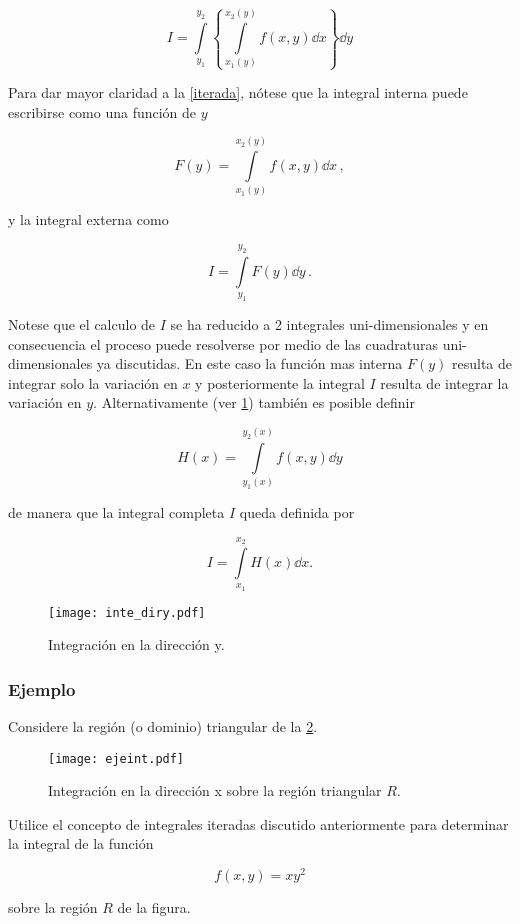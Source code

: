 \begin{equation}
  I = \int\limits_{y_1}^{y_2} \left\{ \int\limits_{x_1(y)}^{x_2(y)} f(x,y) \dd{x}  \right\} \dd{y}
  \label{iterada}
\end{equation}


Para dar mayor claridad a la \cref{iterada}, nótese que la integral interna puede escribirse como una función de $y$

\[F(y) = \int\limits_{x_1(y)}^{x_2(y)} f(x,y) \dd{x}\, , \]

y la integral externa como

\[I = \int\limits_{y_1}^{y_2} F(y) \dd{y}\, . \]

Notese que el calculo de $I$ se ha reducido a 2 integrales uni-dimensionales y en consecuencia el proceso puede resolverse por medio de las cuadraturas uni-dimensionales ya discutidas. En este caso la función mas interna $F(y)$ resulta de integrar solo la variación en $x$ y posteriormente la integral $I$ resulta de integrar la variación en $y$. Alternativamente (ver \cref{fig:diry}) también es posible definir

\[H(x) = \int\limits_{y_1(x)}^{y_2(x)} f(x,y) \dd{y} \]

de manera que la integral completa $I$ queda definida por

\[I = \int\limits_{x_1}^{x_2} H(x) \dd{x}. \]

\begin{figure}[H]
\centering
\texttt{[image: inte\_diry.pdf]}
\caption{Integración en la dirección y.}
\label{fig:diry}
\end{figure}


\subsubsection*{Ejemplo}

Considere la región (o dominio) triangular de la \cref{fig:ejeint}.


\begin{figure}[h]
	\centering
	\texttt{[image: ejeint.pdf]}
	\caption{Integración en la dirección x sobre la región triangular $R$.}
	\label{fig:ejeint}
\end{figure}



Utilice el concepto de integrales iteradas discutido anteriormente para determinar la integral de la función

\[f(x,y)=x y^2\]

sobre la región $R$ de la figura.

